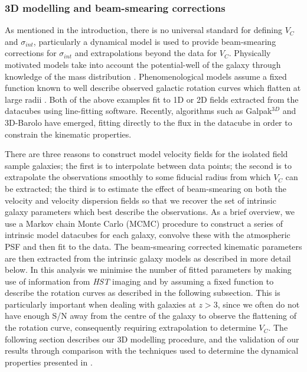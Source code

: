\documentclass[fleqn,usenatbib]{mn2e}
\begin{document}
\subsubsection{3D modelling and beam-smearing corrections}\label{subsec:3d_modelling}

As mentioned in the introduction, there is no universal standard for defining $V_{C}$ and $\sigma_{int}$, particularly a dynamical model is used to provide beam-smearing corrections for $\sigma_{int}$ and extrapolations beyond the data for $V_{C}$.
Physically motivated models take into account the potential-well of the galaxy through knowledge of the mass distribution \citep[e.g.][]{Genzel2008,ForsterSchreiber2009,Gnerucci2011,Wisnioski2015,Swinbank2017}.
Phenomenological models assume a fixed function known to well describe observed galactic rotation curves which flatten at large radii \citep[e.g.][]{Epinat2010,Epinat2012,Swinbank2012,Stott2016,Harrison2017}.
Both of the above examples fit to 1D or 2D fields extracted from the datacubes using line-fitting software.
Recently, algorithms such as Galpak$^{3D}$ \citep{Bouche2015} and 3D-Barolo \citep{DiTeodoro2015} have emerged, fitting directly to the flux in the datacube in order to constrain the kinematic properties.

There are three reasons to construct model velocity fields for the isolated field sample galaxies; the first is to interpolate between data points; the second is to extrapolate the observations smoothly to some fiducial radius from which $V_{C}$ can be extracted; the third is to estimate the effect of beam-smearing on both the velocity and velocity dispersion fields so that we recover the set of intrinsic galaxy parameters which best describe the observations.
As a brief overview, we use a Markov chain Monte Carlo (MCMC) procedure to construct a series of intrinsic model datacubes for each galaxy, convolve these with the atmospheric PSF and then fit to the data.
The beam-smearing corrected kinematic parameters are then extracted from the intrinsic galaxy models as described in more detail below.
In this analysis we minimise the number of fitted parameters by making use of information from {\em HST} imaging and by assuming a fixed function to describe the rotation curves as described in the following subsection.    
This is particularly important when dealing with galaxies at $z > 3$, since we often do not have enough S/N away from the centre of the galaxy to observe the flattening of the rotation curve, consequently requiring extrapolation to determine $V_{C}$.  
The following section describes our 3D modelling procedure, and the validation of our results through comparison with the techniques used to determine the dynamical properties presented in \cite{Harrison2017}.
\end{document}
